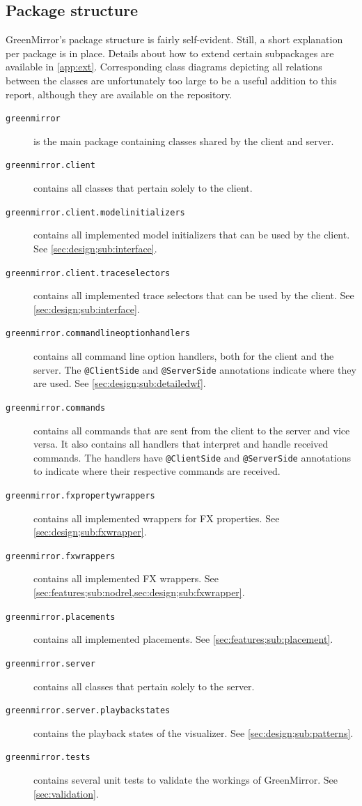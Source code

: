 \subsection{Package structure}\label{sec:design;sub:package}
GreenMirror's package structure is fairly self-evident. Still, a short explanation per package is in place. Details about how to extend certain subpackages are available in \cref{app:ext}. Corresponding class diagrams depicting all relations between the classes are unfortunately too large to be a useful addition to this report, although they are available on the repository.
\begin{description}
\item[\texttt{greenmirror}] is the main package containing classes shared by the client and server.
\item[\texttt{greenmirror.client}] contains all classes that pertain solely to the client.
\item[\texttt{greenmirror.client.modelinitializers}] contains all implemented model initializers that can be used by the client. See \cref{sec:design;sub:interface}.
\item[\texttt{greenmirror.client.traceselectors}] contains all implemented trace selectors that can be used by the client. See \cref{sec:design;sub:interface}.
\item[\texttt{greenmirror.commandlineoptionhandlers}] contains all command line option handlers, both for the client and the server. The \lstinline{@ClientSide} and \lstinline{@ServerSide} annotations indicate where they are used. See \cref{sec:design;sub:detailedwf}.
\item[\texttt{greenmirror.commands}] contains all commands that are sent from the client to the server and vice versa. It also contains all handlers that interpret and handle received commands. The handlers have \lstinline{@ClientSide} and \lstinline{@ServerSide} annotations to indicate where their respective commands are received.
\item[\texttt{greenmirror.fxpropertywrappers}] contains all implemented wrappers for FX properties. See \cref{sec:design;sub:fxwrapper}.
\item[\texttt{greenmirror.fxwrappers}] contains all implemented FX wrappers. See \cref{sec:features;sub:nodrel,sec:design;sub:fxwrapper}.
\item[\texttt{greenmirror.placements}] contains all implemented placements. See \cref{sec:features;sub:placement}.
\item[\texttt{greenmirror.server}] contains all classes that pertain solely to the server.
\item[\texttt{greenmirror.server.playbackstates}] contains the playback states of the visualizer. See \cref{sec:design;sub:patterns}.
\item[\texttt{greenmirror.tests}] contains several unit tests to validate the workings of GreenMirror. See \cref{sec:validation}.
\end{description} 
